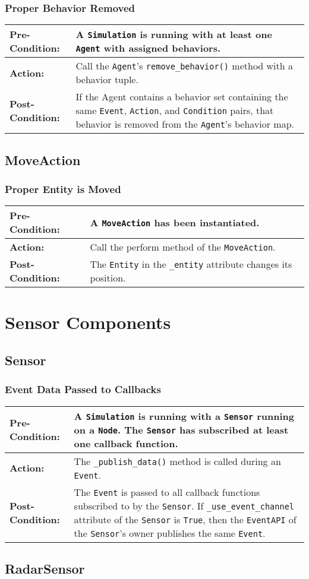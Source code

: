 \documentclass[titlepage]{article}
\newcommand{\testcase}[3]{
    \begin{center}
    \begin{tabular}{| l | p{0.7\textwidth}|}
        \hline
        \rowcolor[gray]{0.8}\textbf{Pre-Condition:} & #1 \\ \hline
        \textbf{Action:} & #2 \\ \hline
        \rowcolor[gray]{0.8}\textbf{Post-Condition:} & #3 \\ \hline
    \end{tabular}
    \end{center}
}
\begin{document}
\subsubsection{Proper Behavior Removed}
\testcase{A \texttt{Simulation} is running with at least one \texttt{Agent} with assigned behaviors.}{Call the \texttt{Agent}'s \texttt{remove\_behavior()} method with a behavior tuple.}{If the Agent contains a behavior set containing the same \texttt{Event}, \texttt{Action}, and \texttt{Condition} pairs, that behavior is removed from the \texttt{Agent}'s behavior map.}

\subsection{MoveAction}
\subsubsection{Proper Entity is Moved}
\testcase{A \texttt{MoveAction} has been instantiated.}{Call the perform method of the \texttt{MoveAction}.}{The \texttt{Entity} in the \texttt{\_entity} attribute changes its position.}

\section{Sensor Components}
\subsection{Sensor}
\subsubsection{Event Data Passed to Callbacks}
\testcase{A \texttt{Simulation} is running with a \texttt{Sensor} running on a \texttt{Node}. The \texttt{Sensor} has subscribed at least one callback function.}{The \texttt{\_publish\_data()} method is called during an \texttt{Event}.}{The \texttt{Event} is passed to all callback functions subscribed to by the \texttt{Sensor}. If \texttt{\_use\_event\_channel} attribute of the \texttt{Sensor} is \texttt{True}, then the \texttt{EventAPI} of the \texttt{Sensor}'s owner publishes the same \texttt{Event}.}

\subsection{RadarSensor}
\end{document}
